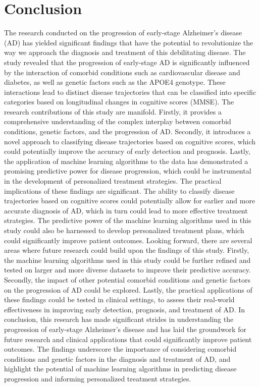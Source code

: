 \documentclass[conference]{IEEEtran}
\begin{document}
\section{Conclusion}
The research conducted on the progression of early-stage Alzheimer's disease (AD) has yielded significant findings that have the potential to revolutionize the way we approach the diagnosis and treatment of this debilitating disease. The study revealed that the progression of early-stage AD is significantly influenced by the interaction of comorbid conditions such as cardiovascular disease and diabetes, as well as genetic factors such as the APOE4 genotype. These interactions lead to distinct disease trajectories that can be classified into specific categories based on longitudinal changes in cognitive scores (MMSE). The research contributions of this study are manifold. Firstly, it provides a comprehensive understanding of the complex interplay between comorbid conditions, genetic factors, and the progression of AD. Secondly, it introduces a novel approach to classifying disease trajectories based on cognitive scores, which could potentially improve the accuracy of early detection and prognosis. Lastly, the application of machine learning algorithms to the data has demonstrated a promising predictive power for disease progression, which could be instrumental in the development of personalized treatment strategies. The practical implications of these findings are significant. The ability to classify disease trajectories based on cognitive scores could potentially allow for earlier and more accurate diagnosis of AD, which in turn could lead to more effective treatment strategies. The predictive power of the machine learning algorithms used in this study could also be harnessed to develop personalized treatment plans, which could significantly improve patient outcomes. Looking forward, there are several areas where future research could build upon the findings of this study. Firstly, the machine learning algorithms used in this study could be further refined and tested on larger and more diverse datasets to improve their predictive accuracy. Secondly, the impact of other potential comorbid conditions and genetic factors on the progression of AD could be explored. Lastly, the practical applications of these findings could be tested in clinical settings, to assess their real-world effectiveness in improving early detection, prognosis, and treatment of AD. In conclusion, this research has made significant strides in understanding the progression of early-stage Alzheimer's disease and has laid the groundwork for future research and clinical applications that could significantly improve patient outcomes. The findings underscore the importance of considering comorbid conditions and genetic factors in the diagnosis and treatment of AD, and highlight the potential of machine learning algorithms in predicting disease progression and informing personalized treatment strategies.
\end{document}
